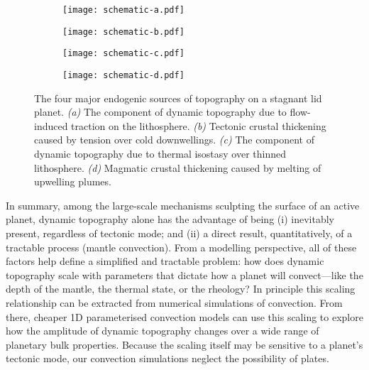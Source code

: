 \begin{figure*}
  \centering
  \begin{subfigure}[b]{0.5\textwidth}
    \texttt{[image: schematic-a.pdf]}
    \caption{}
    \label{fig:schematic-a}   
  \end{subfigure}  
  \hfill           
  \begin{subfigure}[b]{0.5\textwidth}
    \texttt{[image: schematic-b.pdf]}
    \caption{}
    \label{fig:schematic-b}
  \end{subfigure}     %
           
  \begin{subfigure}[b]{0.5\textwidth}
    \texttt{[image: schematic-c.pdf]}
    \caption{}
    \label{fig:schematic-c}
  \end{subfigure}
  \hfill
    \begin{subfigure}[b]{0.5\textwidth}
    \texttt{[image: schematic-d.pdf]}
    \caption{}
    \label{fig:schematic-d}
  \end{subfigure}
  \caption[The four major endogenic sources of topography on a stagnant lid planet.]{The four major endogenic sources of topography on a stagnant lid planet. \textit{(a)} The component of dynamic topography due to flow-induced traction on the lithosphere. \textit{(b)} Tectonic crustal thickening caused by tension over cold downwellings. \textit{(c)} The component of dynamic topography due to thermal isostasy over thinned lithosphere. \textit{(d)} Magmatic crustal thickening caused by melting of upwelling plumes.}
  \label{fig:topography-schematic}
\end{figure*}




In summary, among the large-scale mechanisms sculpting the surface of an active planet, dynamic topography alone has the advantage of being (i) inevitably present, regardless of tectonic mode; and (ii) a direct result, quantitatively, of a tractable process (mantle convection). From a modelling perspective, all of these factors help define a simplified and tractable problem: how does dynamic topography scale with parameters that dictate how a planet will convect---like the depth of the mantle, the thermal state, or the rheology? In principle this scaling relationship can be extracted from numerical simulations of convection. From there, cheaper 1D parameterised convection models can use this scaling to explore how the amplitude of dynamic topography changes over a wide range of planetary bulk properties. Because the scaling itself may be sensitive to a planet's tectonic mode, our convection simulations neglect the possibility of plates.

